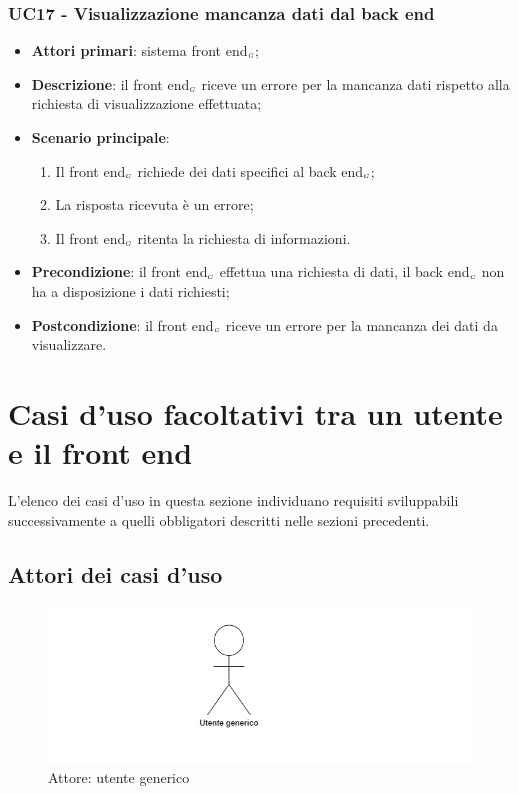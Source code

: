 \subsubsection{UC17 - Visualizzazione mancanza dati dal back end}\label{CasiDUsoCasiDUsoTraIlFrontEndEIlBackEndElencoDeiCasiDUsoUC9VisualizzazioneMessaggioDiMancanzaDatiDalBackEnd}
\begin{itemize}
	\item \textbf{Attori primari}: sistema front end$_{\scaleto{G}{3pt}}$;
	\item \textbf{Descrizione}: il front end$_{\scaleto{G}{3pt}}$ riceve un errore per la mancanza dati rispetto alla richiesta di visualizzazione effettuata;
	\item \textbf{Scenario principale}:
	\begin{enumerate}
		\item Il front end$_{\scaleto{G}{3pt}}$ richiede dei dati specifici al back end$_{\scaleto{G}{3pt}}$;
		\item La risposta ricevuta è un errore;
		\item Il front end$_{\scaleto{G}{3pt}}$ ritenta la richiesta di informazioni.
	\end{enumerate}
	\item \textbf{Precondizione}: il front end$_{\scaleto{G}{3pt}}$ effettua una richiesta di dati, il back end$_{\scaleto{G}{3pt}}$ non ha a disposizione i dati richiesti;
	\item \textbf{Postcondizione}: il front end$_{\scaleto{G}{3pt}}$ riceve un errore per la mancanza dei dati da visualizzare.
\end{itemize}

\newpage
\section{Casi d'uso facoltativi tra un utente e il front end}\label{CasiDUsoCasiDUsoFacoltativiTraUnUtenteEIlFrontEnd}
L'elenco dei casi d'uso in questa sezione individuano requisiti sviluppabili successivamente a quelli obbligatori descritti nelle sezioni precedenti.
\subsection{Attori dei casi d'uso}
\begin{center}
	\begin{figure}[H]
		\centering\includegraphics{../immagini/attori_casi/utente_generico.png}
		\caption{Attore: utente generico}
	\end{figure}
\end{center}
